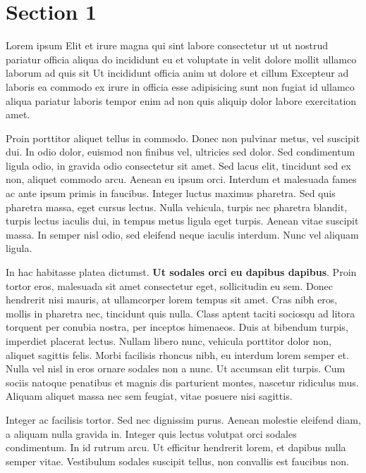 
\section{Section 1}
\label{sec:section_1}

    Lorem ipsum Elit et irure magna qui sint labore consectetur ut ut nostrud pariatur officia aliqua do incididunt eu et voluptate in velit dolore mollit ullamco laborum ad quis sit Ut incididunt officia anim ut dolore et cillum Excepteur ad laboris ea commodo ex irure in officia esse adipisicing sunt non fugiat id ullamco aliqua pariatur laboris tempor enim ad non quis aliquip dolor labore exercitation amet.

    Proin porttitor aliquet tellus in commodo. Donec non pulvinar metus, vel suscipit dui. In odio dolor, euismod non finibus vel, ultricies sed dolor. Sed condimentum ligula odio, in gravida odio consectetur sit amet. Sed lacus elit, tincidunt sed ex non, aliquet commodo arcu. Aenean eu ipsum orci. Interdum et malesuada fames ac ante ipsum primis in faucibus. Integer luctus maximus pharetra. Sed quis pharetra massa, eget cursus lectus. Nulla vehicula, turpis nec pharetra blandit, turpis lectus iaculis dui, in tempus metus ligula eget turpis. Aenean vitae suscipit massa. In semper nisl odio, sed eleifend neque iaculis interdum. Nunc vel aliquam ligula.

    In hac habitasse platea dictumst. \textbf{Ut sodales orci eu dapibus dapibus}. Proin tortor eros, malesuada sit amet consectetur eget, sollicitudin eu sem. Donec hendrerit nisi mauris, at ullamcorper lorem tempus sit amet. Cras nibh eros, mollis in pharetra nec, tincidunt quis nulla. Class aptent taciti sociosqu ad litora torquent per conubia nostra, per inceptos himenaeos. Duis at bibendum turpis, imperdiet placerat lectus. Nullam libero nunc, vehicula porttitor dolor non, aliquet sagittis felis. Morbi facilisis rhoncus nibh, eu interdum lorem semper et. Nulla vel nisl in eros ornare sodales non a nunc. Ut accumsan elit turpis. Cum sociis natoque penatibus et magnis dis parturient montes, nascetur ridiculus mus. Aliquam aliquet massa nec sem feugiat, vitae posuere nisi sagittis.

    Integer ac facilisis tortor. Sed nec dignissim purus. Aenean molestie eleifend diam, a aliquam nulla gravida in. Integer quis lectus volutpat orci sodales condimentum. In id rutrum arcu. Ut efficitur hendrerit lorem, et dapibus nulla semper vitae. Vestibulum sodales suscipit tellus, non convallis est faucibus non.
